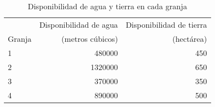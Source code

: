\begin{table}[H]
\centering
\begin{tabular}{lrr}
\hline
       & Disponibilidad de agua & Disponibilidad de tierra \\
Granja & (metros cúbicos)       & (hectárea)               \\ \hline
1      & 480000                 & 450                      \\
2      & 1320000                & 650                      \\
3      & 370000                 & 350                      \\
4      & 890000                 & 500                      \\ \hline
\end{tabular}
\caption{Disponibilidad de agua y tierra en cada granja}
\label{tabla:1}
\end{table}

